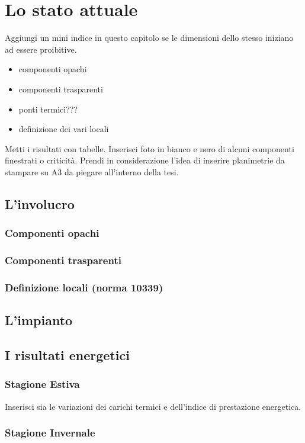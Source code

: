 \chapter{Lo stato attuale}
\thispagestyle{empty}

Aggiungi un mini indice in questo capitolo se le dimensioni dello stesso iniziano ad essere proibitive.

\begin{itemize}
	\item componenti opachi
	\item componenti trasparenti
	\item ponti termici???
	\item definizione dei vari locali
\end{itemize}
Metti i risultati con tabelle. 
Inserisci foto in bianco e nero di alcuni componenti finestrati o criticità.
Prendi in considerazione l'idea di inserire planimetrie da stampare su A3 da piegare all'interno della tesi. 
\section{L'involucro}
\subsection{Componenti opachi}
\subsection{Componenti trasparenti}
\subsection{Definizione locali (norma 10339)}
\section{L'impianto}
\section{I risultati energetici}
\subsection{Stagione Estiva}
Inserisci sia le variazioni dei carichi termici e dell'indice di prestazione energetica.
\subsection{Stagione Invernale}
